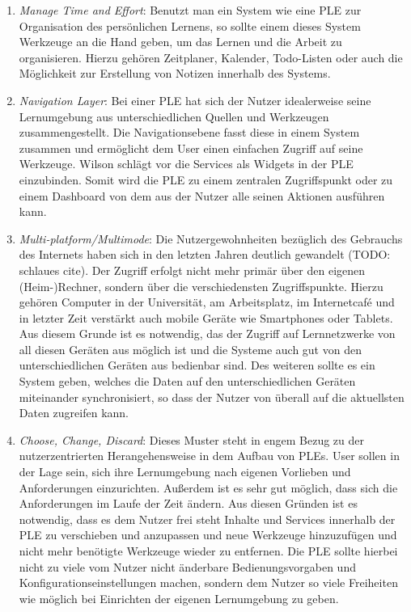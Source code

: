 \begin{enumerate}
 \item \emph{Manage Time and Effort}\label{wilson_patterns:manage_time_effort}: Benutzt man ein System wie eine PLE zur Organisation des persönlichen Lernens, so sollte einem dieses System Werkzeuge an die Hand geben, um das Lernen und die Arbeit zu organisieren. Hierzu gehören Zeitplaner, Kalender, Todo-Listen oder auch die Möglichkeit zur Erstellung von Notizen innerhalb des Systems.
 \item \emph{Navigation Layer}\label{wilson_patterns:navigation_layer}: Bei einer PLE hat sich der Nutzer idealerweise seine Lernumgebung aus unterschiedlichen Quellen und Werkzeugen zusammengestellt. Die Navigationsebene fasst diese in einem System zusammen und ermöglicht dem User einen einfachen Zugriff auf seine Werkzeuge. Wilson schlägt vor die Services als Widgets in der PLE einzubinden. Somit wird die PLE zu einem zentralen Zugriffspunkt oder zu einem Dashboard von dem aus der Nutzer alle seinen Aktionen ausführen kann. 
 \item \emph{Multi-platform/Multimode}\label{wilson_patterns:multimode}: Die Nutzergewohnheiten bezüglich des Gebrauchs des Internets haben sich in den letzten Jahren deutlich gewandelt (TODO: schlaues cite). Der Zugriff erfolgt nicht mehr primär über den eigenen (Heim-)Rechner, sondern über die verschiedensten Zugriffspunkte. Hierzu gehören Computer in der Universität, am Arbeitsplatz, im Internetcafé und in letzter Zeit verstärkt auch mobile Geräte wie Smartphones oder Tablets. Aus diesem Grunde ist es notwendig, das der Zugriff auf Lernnetzwerke von all diesen Geräten aus möglich ist und die Systeme auch gut von den unterschiedlichen Geräten aus bedienbar sind. Des weiteren sollte es ein System geben, welches die Daten auf den unterschiedlichen Geräten miteinander synchronisiert, so dass der Nutzer von überall auf die aktuellsten Daten zugreifen kann.
 \item \emph{Choose, Change, Discard}\label{wilson_patterns:choose_change_discard}: Dieses Muster steht in engem Bezug zu der nutzerzentrierten Herangehensweise in dem Aufbau von PLEs. User sollen in der Lage sein, sich ihre Lernumgebung nach eigenen Vorlieben und Anforderungen einzurichten. Außerdem ist es sehr gut möglich, dass sich die Anforderungen im Laufe der Zeit ändern. Aus diesen Gründen ist es notwendig, dass es dem Nutzer frei steht Inhalte und Services innerhalb der PLE zu verschieben und anzupassen und neue Werkzeuge hinzuzufügen und nicht mehr benötigte Werkzeuge wieder zu entfernen. Die PLE sollte hierbei nicht zu viele vom Nutzer nicht änderbare Bedienungsvorgaben und Konfigurationseinstellungen machen, sondern dem Nutzer so viele Freiheiten wie möglich bei Einrichten der eigenen Lernumgebung zu geben.
\end{enumerate}

